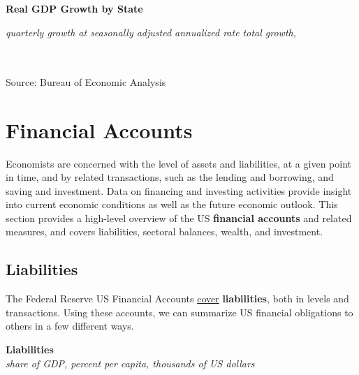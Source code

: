\documentclass{report}
\begin{document}
\normalsize \textbf{Real GDP Growth by State}\\
\footnotesize{\textit{quarterly growth at seasonally adjusted annualized rate \hspace{20mm} total growth, }\\ 

\vspace{-4.5mm}
\hspace{-2mm} \noindent {} \setlength{\tabcolsep}{3.7pt} \color{black!90}
		{\renewcommand{\arraystretch}{1.44}
		 \begin{tabular}{p{30mm} R{7mm} R{7mm} R{7mm} R{7mm} R{7mm} p{0mm} R{9mm} R{9mm} R{10mm} }
		 \hline
		\end{tabular}}	\\

\vspace{-3mm}	
\footnotesize{Source: Bureau of Economic Analysis}

\newpage
\hypertarget{ofa}{}
\section*{Financial Accounts}
\begin{minipage}{0.76\textwidth}
\small Economists are concerned with the level of assets and liabilities, at a given point in time, and by related transactions, such as the lending and borrowing, and saving and investment. Data on financing and investing activities provide insight into current economic conditions as well as the future economic outlook. This section provides a high-level overview of the US \textbf{financial accounts} and related measures, and covers liabilities, sectoral balances, wealth, and investment. 
\hypertarget{of1}{}
\subsection*{Liabilities}
\small The Federal Reserve US Financial Accounts \href{https://www.federalreserve.gov/releases/z1/}{cover} \textbf{liabilities}, both in levels and transactions. Using these accounts, we can summarize US financial obligations to others in a few different ways. 


\vspace{2mm}

\normalsize \textbf{Liabilities}\\
\footnotesize{\textit{share of GDP, percent \hspace{35mm} per capita, thousands of US dollars}}
\vspace{3.05cm}


\end{minipage}}
\end{document}
